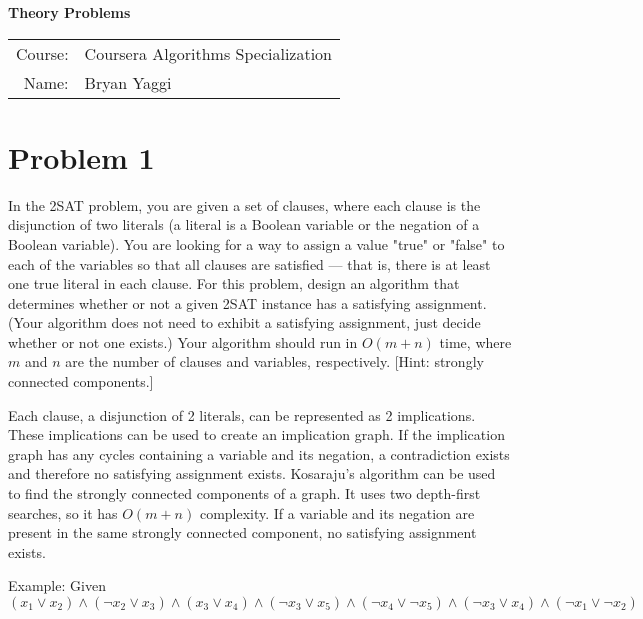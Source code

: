 \documentclass[10pt]{article}
\begin{document}
\begin{center}
{\Large \textbf{Theory Problems}}

\begin{tabular}{rl}
\\
Course: & Coursera Algorithms Specialization \\
Name: & Bryan Yaggi
\end{tabular}
\end{center}

\section*{\normalsize Problem 1}

In the 2SAT problem, you are given a set of clauses, where each clause is the disjunction of two literals (a literal is a Boolean variable or the negation of a Boolean variable). You are looking for a way to assign a value "true" or "false" to each of the variables so that all clauses are satisfied --- that is, there is at least one true literal in each clause. For this problem, design an algorithm that determines whether or not a given 2SAT instance has a satisfying assignment. (Your algorithm does not need to exhibit a satisfying assignment, just decide whether or not one exists.) Your algorithm should run in $O(m+n)$ time, where $m$ and $n$ are the number of clauses and variables, respectively. [Hint: strongly connected components.]
\bigskip

Each clause, a disjunction of 2 literals, can be represented as 2 implications. These implications can be used to create an implication graph. If the implication graph has any cycles containing a variable and its negation, a contradiction exists and therefore no satisfying assignment exists. Kosaraju's algorithm can be used to find the strongly connected components of a graph. It uses two depth-first searches, so it has $O(m + n)$ complexity. If a variable and its negation are present in the same strongly connected component, no satisfying assignment exists. 
\smallskip

Example: Given $(x_1 \vee x_2) \wedge (\neg x_2 \vee x_3) \wedge (x_3 \vee x_4) \wedge (\neg x_3 \vee x_5) \wedge (\neg x_4 \vee \neg x_5) \wedge (\neg x_3 \vee x_4) \wedge (\neg x_1 \vee \neg x_2)$
\end{document}
